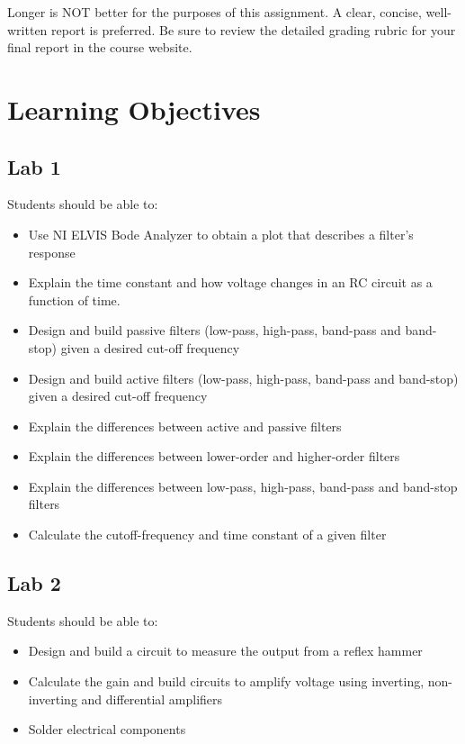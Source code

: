 \documentclass{article}
\begin{document}
Longer is NOT better for the purposes of this assignment. A clear, concise, well-written report is preferred. Be sure to review the detailed grading rubric for your final report in the course website.

\pagebreak
\section*{Learning Objectives}
\subsection*{Lab 1}
Students should be able to:
\begin{itemize}
	\item Use NI ELVIS Bode Analyzer to obtain a plot that describes a filter’s response
	\item Explain the time constant and how voltage changes in an RC circuit as a function of time.
	\item Design and build passive filters (low-pass, high-pass, band-pass and band-stop) given a desired cut-off frequency
	\item Design and build active filters (low-pass, high-pass, band-pass and band-stop) given a desired cut-off frequency
	\item Explain the differences between active and passive filters
	\item Explain the differences between lower-order and higher-order filters
	\item Explain the differences between low-pass, high-pass, band-pass and band-stop filters
	\item Calculate the cutoff-frequency and time constant of a given filter 
\end{itemize}

\subsection*{Lab 2}
Students should be able to:
\begin{itemize}
	\item Design and build a circuit to measure the output from a reflex hammer
	\item Calculate the gain and build circuits to amplify voltage using inverting, non-inverting and differential amplifiers
	\item Solder electrical components 
\end{itemize}
\end{document}
